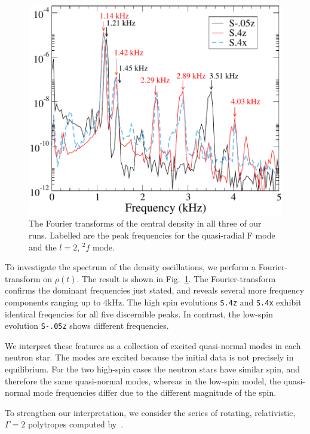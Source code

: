\begin{figure}
\includegraphics[width=0.95\columnwidth]{chap2/Density_FFT}
\caption[The Fourier transforms of the central density in all three of our runs.]{\label{fig:Density_FFT} The Fourier transforms of the central
  density in all three of our runs. Labelled are the peak frequencies
  for the quasi-radial F mode and the $l=2$, $^2f$ mode.}
\end{figure}

To investigate the spectrum of the density oscillations, we perform a
Fourier-transform on $\rho(t)$. The result is shown in
Fig.~\ref{fig:Density_FFT}. The Fourier-transform confirms the
dominant frequencies just stated, and reveals several more frequency
components ranging up to 4kHz. The high spin evolutions {\tt S.4z} and
{\tt S.4x} exhibit identical freqencies for all five discernible peaks. In
contrast, the low-spin evolution {\tt S-.05z} shows different frequencies. 

We interpret these features as a collection of excited quasi-normal
modes in each neutron star. The modes are excited because the initial
data is not precisely in equilibrium. For the two high-spin cases the
neutron stars have similar spin, and therefore the same quasi-normal
modes, whereas in the low-spin model, the quasi-normal mode
frequencies differ due to the different magnitude of the spin.

To strengthen our interpretation, we consider the series of rotating,
relativistic, $\Gamma=2$ polytropes computed by~\cite{Dimmelmeier:2005zk}. 

